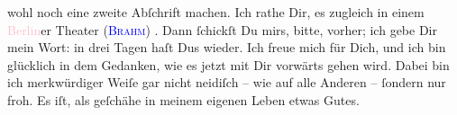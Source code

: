                wohl noch eine zweite Abſchrift machen. Ich rathe Dir, es zugleich in einem \textcolor{pink}{Berlin}{}\ledrightnote{\textcolor{pink}{Berlin}}er Theater (\textsc{\textcolor{brown}{\textcolor{blue}{Brahm}{}\ledrightnote{\textcolor{blue}{Otto Brahm}}}{}\ledrightnote{{$\rightarrow$}\textcolor{brown}{Lessing-Theater}}}) \label{K_L02616-5v}\label{K_L02616-5h}. Dann ſchickſt Du mirs, bitte, vorher;
               ich gebe Dir mein Wort: in drei Tagen haſt Dus wieder. Ich freue mich für Dich, und
               ich bin glücklich in dem Gedanken, wie es jetzt mit Dir vorwärts gehen wird. Dabei
               bin ich merkwürdiger Weiſe gar nicht neidiſch – wie auf alle Anderen – ſondern nur
               froh. Es iſt, als geſchähe in meinem eigenen Leben etwas Gutes.\pend
           

